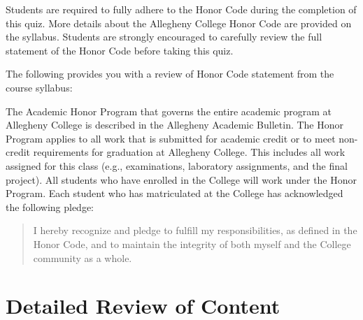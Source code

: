 \noindent Students are required to fully adhere to the Honor Code during the completion of this quiz. More details about
the Allegheny College Honor Code are provided on the syllabus. Students are strongly encouraged to carefully review the
full statement of the Honor Code before taking this quiz.

\noindent The following provides you with a review of Honor Code statement from the course syllabus:

The Academic Honor Program that governs the entire academic program at Allegheny College is described in the Allegheny
Academic Bulletin.  The Honor Program applies to all work that is submitted for academic credit or to meet non-credit
requirements for graduation at Allegheny College.  This includes all work assigned for this class (e.g., examinations,
  laboratory assignments, and the final project).  All students who have enrolled in the College will work under the Honor
Program.  Each student who has matriculated at the College has acknowledged the following pledge:

\vspace*{-.11in}
\begin{quote}
  I hereby recognize and pledge to fulfill my responsibilities, as defined in the Honor Code, and to maintain the
  integrity of both myself and the College community as a whole.
\end{quote}
\vspace*{-.11in}


\vspace*{-.15in}
\section*{Detailed Review of Content}
\vspace*{-.1in}

